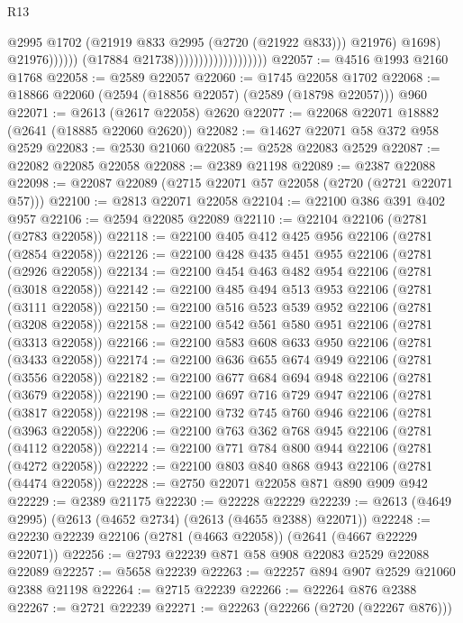 \begin{lexlean}{R13}
\begin{coremodule}
                                                        @2995
                                                        @1702
                                                        (@21919 @833 @2995 (@2720 (@21922 @833)))
                                                        @21976)
                                                      @1698)
                                                    @21976))))))
                                        (@17884 @21738)))))))))))))))))))
@22057 := @4516 @1993 @2160 @1768
@22058 := @2589 @22057
@22060 := @1745 @22058 @1702
@22068 := @18866 @22060 (@2594 (@18856 @22057) (@2589 (@18798 @22057))) @960
@22071 := @2613 (@2617 @22058) @2620
@22077 := @22068 @22071 @18882 (@2641 (@18885 @22060 @2620))
@22082 := @14627 @22071 @58 @372 @958 @2529
@22083 := @2530 @21060
@22085 := @2528 @22083 @2529
@22087 := @22082 @22085 @22058
@22088 := @2389 @21198
@22089 := @2387 @22088
@22098 := @22087 @22089 (@2715 @22071 @57 @22058 (@2720 (@2721 @22071 @57)))
@22100 := @2813 @22071 @22058
@22104 := @22100 @386 @391 @402 @957
@22106 := @2594 @22085 @22089
@22110 := @22104 @22106 (@2781 (@2783 @22058))
@22118 := @22100 @405 @412 @425 @956 @22106 (@2781 (@2854 @22058))
@22126 := @22100 @428 @435 @451 @955 @22106 (@2781 (@2926 @22058))
@22134 := @22100 @454 @463 @482 @954 @22106 (@2781 (@3018 @22058))
@22142 := @22100 @485 @494 @513 @953 @22106 (@2781 (@3111 @22058))
@22150 := @22100 @516 @523 @539 @952 @22106 (@2781 (@3208 @22058))
@22158 := @22100 @542 @561 @580 @951 @22106 (@2781 (@3313 @22058))
@22166 := @22100 @583 @608 @633 @950 @22106 (@2781 (@3433 @22058))
@22174 := @22100 @636 @655 @674 @949 @22106 (@2781 (@3556 @22058))
@22182 := @22100 @677 @684 @694 @948 @22106 (@2781 (@3679 @22058))
@22190 := @22100 @697 @716 @729 @947 @22106 (@2781 (@3817 @22058))
@22198 := @22100 @732 @745 @760 @946 @22106 (@2781 (@3963 @22058))
@22206 := @22100 @763 @362 @768 @945 @22106 (@2781 (@4112 @22058))
@22214 := @22100 @771 @784 @800 @944 @22106 (@2781 (@4272 @22058))
@22222 := @22100 @803 @840 @868 @943 @22106 (@2781 (@4474 @22058))
@22228 := @2750 @22071 @22058 @871 @890 @909 @942
@22229 := @2389 @21175
@22230 := @22228 @22229
@22239 := @2613 (@4649 @2995) (@2613 (@4652 @2734) (@2613 (@4655 @2388) @22071))
@22248 := @22230 @22239 @22106 (@2781 (@4663 @22058)) (@2641 (@4667 @22229 @22071))
@22256 := @2793 @22239 @871 @58 @908 @22083 @2529 @22088 @22089
@22257 := @5658 @22239
@22263 := @22257 @894 @907 @2529 @21060 @2388 @21198
@22264 := @2715 @22239
@22266 := @22264 @876 @2388
@22267 := @2721 @22239
@22271 := @22263 (@22266 (@2720 (@22267 @876)))

\end{coremodule}
\end{lexlean}
